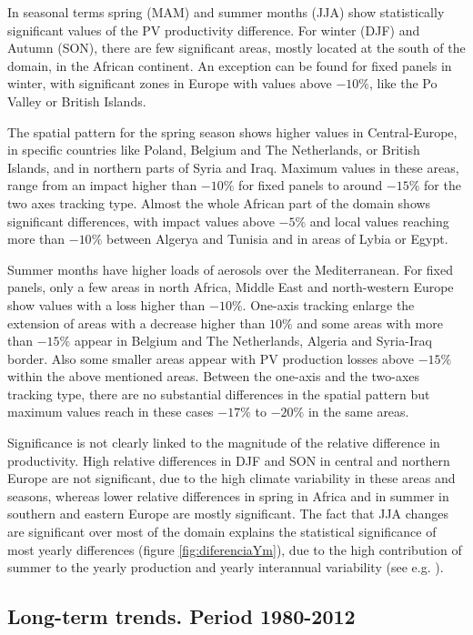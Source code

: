 In seasonal terms spring (MAM) and summer months (JJA) show statistically significant values of the PV productivity difference. For winter (DJF) and Autumn (SON), there are few significant areas, mostly located at the south of the domain, in the African continent. An exception can be found for fixed panels in winter, with significant zones in Europe with values above $-10\%$, like the Po Valley or British Islands. 

The spatial pattern for the spring season shows higher values in Central-Europe, in specific countries like Poland, Belgium and The Netherlands, or British Islands, and in northern parts of Syria and Iraq. Maximum values in these areas, range from an impact higher than $-10\%$ for fixed panels to around $-15\%$ for the two axes tracking type. Almost the whole African part of the domain shows significant differences, with impact values above $-5\%$ and local values reaching more than $-10\%$ between Algerya and Tunisia and in areas of Lybia or Egypt. 

Summer months have higher loads of aerosols over the Mediterranean. For fixed panels, only a few areas in north Africa, Middle East and north-western Europe show values with a loss higher than $-10\%$. One-axis tracking enlarge the extension of areas with a decrease higher than $10\%$ and some areas with more than $-15\%$ appear in Belgium and The Netherlands, Algeria and Syria-Iraq border. Also some smaller areas appear with PV production losses above $-15\%$ within the above mentioned areas. Between the one-axis and the two-axes tracking type, there are no substantial differences in the spatial pattern but maximum values reach in these cases $-17\%$ to $-20\%$ in the same areas.

Significance is not clearly linked to the magnitude of the relative difference in productivity. High relative differences in DJF and SON in central and northern Europe are not significant, due to the high climate variability in these areas and seasons, whereas lower relative differences in spring in Africa and in summer in southern and eastern Europe are mostly significant. The fact that JJA changes are significant over most of the domain explains the statistical significance of most yearly differences (figure \ref{fig:diferenciaYm}), due to the high contribution of summer to the yearly production and yearly interannual variability (see e.g. \cite{Gil2015}).


\subsection{Long-term trends. Period 1980-2012}

